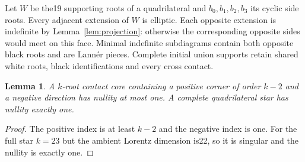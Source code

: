 \documentclass[11pt]{article}
\newtheorem{lemma}[theorem]{Lemma}
\begin{document}
Let $W$ be the19 supporting roots of a quadrilateral and $b_0,b_1,b_2,b_3$
its cyclic side roots. Every adjacent extension of $W$ is elliptic.
Each opposite extension is indefinite by Lemma~\ref{lem:projection}:
otherwise the corresponding opposite sides would meet on this face.
Minimal indefinite subdiagrams contain both opposite black roots and
are Lann\'er pieces. Complete initial union supports retain shared white
roots, black identifications and every cross contact.

\begin{lemma}\label{lem:corank}
A $k$-root contact core containing a positive corner of order $k-2$ and a
negative direction has nullity at most one. A complete quadrilateral
star has nullity exactly one.
\end{lemma}
\begin{proof}
The positive index is at least $k-2$ and the negative index is one.
For the full star $k=23$ but the ambient Lorentz dimension is22, so it
is singular and the nullity is exactly one.
\end{proof}
\end{document}
